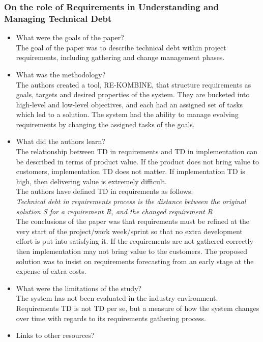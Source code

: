 \documentclass{mprop}
\begin{document}
\subsubsection{On the role of Requirements in Understanding and Managing Technical Debt} \cite{Ernst2012}
\begin{itemize}
\item What were the goals of the paper? \\
The goal of the paper was to describe technical debt within project requirements, including gathering and change management phases.
\item What was the methodology? \\
The authors created a tool, RE-KOMBINE, that structure requirements as goals, targets and desired properties of the system.
They are bucketed into high-level and low-level objectives, and each had an assigned set of tasks which led to a solution.
The system had the ability to manage evolving requirements by changing the assigned tasks of the goals.
\item What did the authors learn?\\
The relationship between TD in requirements and TD in implementation can be described in terms of product value.
If the product does not bring value to customers, implementation TD does not matter. 
If implementation TD is high, then delivering value is extremely difficult.\\
The authors have defined TD in requirements as follows:\\
\textit{Technical debt in requirements process is the distance between the original solution S for a requirement R, and the changed requirement R} \\
The conclusions of the paper was that requirements must be refined at the very start of the project/work week/sprint so that no extra development effort is put into satisfying it.
If the requirements are not gathered correctly then implementation may not bring value to the customers.
The proposed solution was to insist on requirements forecasting from an early stage at the expense of extra costs.
\item What were the limitations of the study?\\
The system has not been evaluated in the industry environment.\\
Requirements TD is not TD per se, but a measure of how the system changes over time with regards to its requirements gathering process.
\item Links to other resources? \\
\end{itemize}
\end{document}
